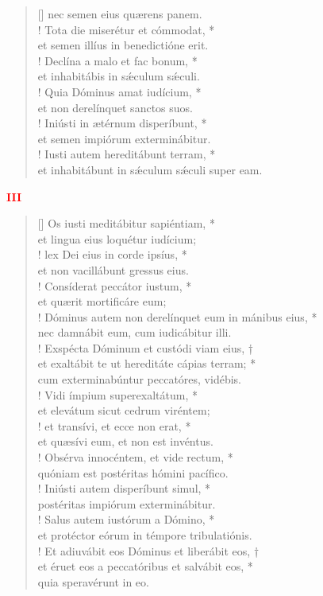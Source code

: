 \begin{verse}[\versewidth]
\vin nec semen eius quærens panem.\\!
Tota die miserétur et cómmodat, *\\
et semen illíus in benedictióne erit.\\!
\vin Declína a malo et fac bonum, *\\
\vin et inhabitábis in s\'{æ}culum s\'{æ}culi.\\!
Quia Dóminus amat iudícium, *\\
et non derelínquet sanctos suos.\\!
\vin Iniústi in ætérnum disperíbunt, *\\
\vin et semen impiórum exterminábitur.\\!
Iusti autem hereditábunt terram, *\\
et inhabitábunt in s\'{æ}culum s\'{æ}culi super eam.\\
\end{verse}
\begin{center}
\textcolor{red}{\bf III}
\end{center}
\begin{verse}[\versewidth]
Os iusti meditábitur sapiéntiam, *\\
et lingua eius loquétur iudícium;\\!
\vin lex Dei eius in corde ipsíus, *\\
\vin et non vacillábunt gressus eius.\\!
Consíderat peccátor iustum, *\\
et quærit mortificáre eum;\\!
\vin Dóminus autem non derelínquet eum in mánibus eius, *\\
\vin nec damnábit eum, cum iudicábitur illi.\\!
Exspécta Dóminum et custódi viam eius, †\\
et exaltábit te ut hereditáte cápias terram; *\\
cum exterminabúntur peccatóres, vidébis.\\!
\vin Vidi ímpium superexaltátum, *\\
\vin et elevátum sicut cedrum viréntem;\\!
et transívi, et ecce non erat, *\\
et quæsívi eum, et non est invéntus.\\!
\vin Obsérva innocéntem, et vide rectum, *\\
\vin quóniam est postéritas hómini pacífico.\\!
Iniústi autem disperíbunt simul, *\\
postéritas impiórum exterminábitur.\\!
\vin Salus autem iustórum a Dómino, *\\
\vin et protéctor eórum in témpore tribulatiónis.\\!
Et adiuvábit eos Dóminus et liberábit eos, †\\
et éruet eos a peccatóribus et salvábit eos, *\\
quia speravérunt in eo.\\
\end{verse}
\vspace{1cm}


